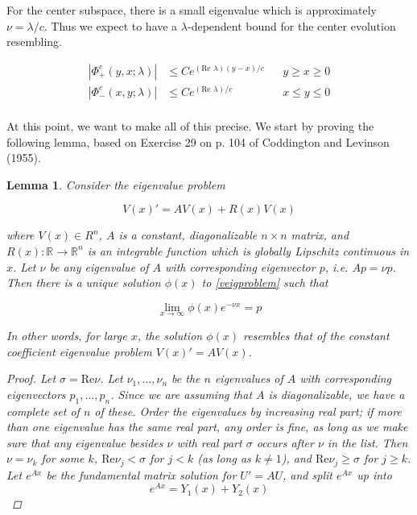 \documentclass[12pt]{article}
\def\R{{\mathbb R}}
\newtheorem{lemma}{Lemma}
\begin{document}
For the center subspace, there is a small eigenvalue which is approximately $\nu = \lambda / c$. Thus we expect to have a $\lambda$-dependent bound for the center evolution resembling.

\begin{align*}
|\Phi^c_+(y, x; \lambda)| &\leq C e^{(\text{Re }\lambda)(y-x)/c} && y \geq x \geq 0 \\
|\Phi^c_-(x, y; \lambda)| &\leq C e^{(\text{Re }\lambda)/c} && x \leq y \leq 0 \\
\end{align*}

At this point, we want to make all of this precise. We start by proving the following lemma, based on Exercise 29 on p. 104 of Coddington and Levinson (1955).

\begin{lemma}Consider the eigenvalue problem

\begin{equation}\label{veigproblem}
V(x)' = AV(x) + R(x)V(x)
\end{equation}

where $V(x) \in R^n$, $A$ is a constant, diagonalizable $n \times n$ matrix, and $R(x): \R \rightarrow \R^n$ is an integrable function which is globally Lipschitz continuous in $x$. Let $\nu$ be any eigenvalue of $A$ with corresponding eigenvector $p$, i.e. $A p = \nu p$. Then there is a unique solution $\phi(x)$ to \eqref{veigproblem} such that 

\[
\lim_{x\rightarrow\infty} \phi(x) e^{-\nu x} = p
\]

In other words, for large $x$, the solution $\phi(x)$ resembles that of the constant coefficient eigenvalue problem $V(x)' = AV(x)$.

\begin{proof}
Let $\sigma = \text{Re} \nu$. Let $\nu_1, \dots, \nu_n$ be the $n$ eigenvalues of $A$ with corresponding eigenvectors $p_1, \dots, p_n$. Since we are assuming that $A$ is diagonalizable, we have a complete set of $n$ of these. Order the eigenvalues by increasing real part; if more than one eigenvalue has the same real part, any order is fine, as long as we make sure that any eigenvalue besides $\nu$ with real part $\sigma$ occurs after $\nu$ in the list. Then $\nu = \nu_k$ for some $k$, $\text{Re} \nu_j < \sigma$ for $j < k$ (as long as $k \neq 1$), and $\text{Re} \nu_j \geq \sigma$ for $j \geq k$. \\

Let $e^{Ax}$ be the fundamental matrix solution for $U' = A U$, and split $e^{Ax}$ up into
\[
e^{Ax} = Y_1(x) + Y_2(x)
\]


\end{proof}
\end{lemma}
\end{document}
